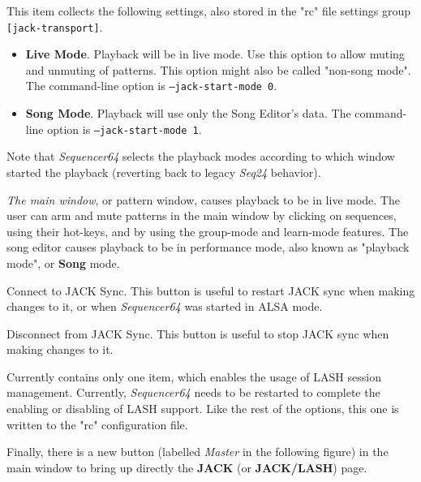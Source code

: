    This item collects the following settings, also stored in the "rc" file
   settings group \texttt{[jack-transport]}.

   \begin{itemize}
      \item \textbf{Live Mode}.
         Playback will be in live mode.  Use this option to allow muting and
         unmuting of patterns.  This option might also be called "non-song
         mode".
         The command-line option is \texttt{--jack-start-mode 0}.
      \item \textbf{Song Mode}.
         Playback will use only the Song Editor's data.
         The command-line option is \texttt{--jack-start-mode 1}.
   \end{itemize}

   Note that \textsl{Sequencer64} 
   selects the playback modes
   according to which window started the playback
   (reverting back to legacy \textsl{Seq24} behavior).

   \textsl{The main window}, or pattern
   window, causes playback to be in live mode.  The user can arm and mute
   patterns in the main window by clicking on sequences, using their hot-keys,
   and by using the group-mode and learn-mode features.
   The song editor causes playback to be in performance mode, also known as
   "playback mode", or \textbf{Song} mode.

   Connect to JACK Sync.
   This button is useful to restart JACK sync when making changes to it,
   or when \textsl{Sequencer64} was started in ALSA mode.

   Disconnect from JACK Sync.
   This button is useful to stop JACK sync when making changes to it.

   Currently contains only one item, which enables the usage of LASH session
   management.  Currently, \textsl{Sequencer64} needs to be restarted to
   complete the enabling or disabling of LASH support.  Like the rest of the
   options, this one is written to the "rc" configuration file.

   Finally, there is a new button (labelled \textsl{Master} in the following
   figure) in the main window to bring up directly the
   \textbf{JACK} (or \textbf{JACK/LASH}) page.


